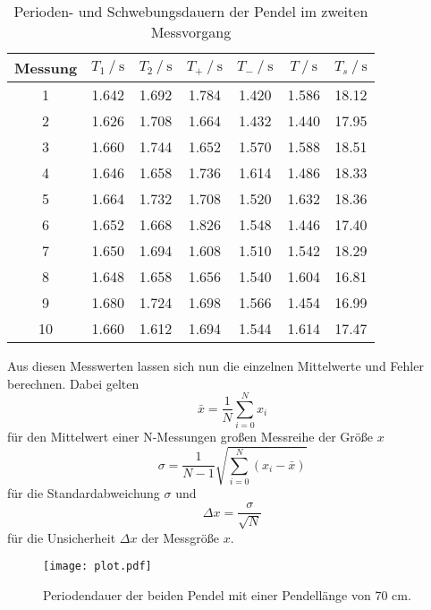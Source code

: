 \begin{table}
  \centering
  \caption{Perioden- und Schwebungsdauern der Pendel im zweiten Messvorgang}
  \label{tab:Messvorgang 2}
  \begin{tabular}{S[table-format=2.0] S S S S S S[table-format=2.2]}
      \toprule
      {Messung} & {$T_1 \mathbin{/} \unit{\second}$} & {$T_2 \mathbin{/} \unit{\second}$} 
      & {$T_+ \mathbin{/} \unit{\second}$} & {$T_- \mathbin{/} \unit{\second}$} & {$T \mathbin{/} \unit{\second}$} & {$T_s \mathbin{/} \unit{\second}$} \\
       & 1.642 & 1.692 & 1.784 & 1.420 & 1.586 & 18.12 \\  
       2 & 1.626 & 1.708 & 1.664 & 1.432 & 1.440 & 17.95 \\ 
       3 & 1.660 & 1.744 & 1.652 & 1.570 & 1.588 & 18.51 \\ 
       4 & 1.646 & 1.658 & 1.736 & 1.614 & 1.486 & 18.33 \\ 
       5 & 1.664 & 1.732 & 1.708 & 1.520 & 1.632 & 18.36 \\ 
       6 & 1.652 & 1.668 & 1.826 & 1.548 & 1.446 & 17.40 \\ 
       7 & 1.650 & 1.694 & 1.608 & 1.510 & 1.542 & 18.29 \\ 
       8 & 1.648 & 1.658 & 1.656 & 1.540 & 1.604 & 16.81 \\ 
       9 & 1.680 & 1.724 & 1.698 & 1.566 & 1.454 & 16.99 \\ 
      10 & 1.660 & 1.612 & 1.694 & 1.544 & 1.614 & 17.47 \\ 
      \bottomrule
  \end{tabular}
\end{table}

Aus diesen Messwerten lassen sich nun die einzelnen Mittelwerte und Fehler berechnen. Dabei gelten
\begin{equation}
  \bar{x}=\dfrac{1}{N}\sum_{i=0}^N x_i
\end{equation}
für den Mittelwert einer N-Messungen großen Messreihe der Größe $x$
\begin{equation}
σ=\dfrac{1}{N-1}\sqrt{\sum_{i=0}^N(x_i-\bar{x})}  
\end{equation}
für die Standardabweichung $σ$ und
\begin{equation}
  Δx=\dfrac{σ}{\sqrt{N}} 
\end{equation}
für die Unsicherheit $Δx$ der Messgröße $x$.


\begin{figure}
  \centering
  \texttt{[image: plot.pdf]}
  \caption{Periodendauer der beiden Pendel mit einer Pendellänge von 70 cm.}
  \label{fig:plot}
\end{figure}


